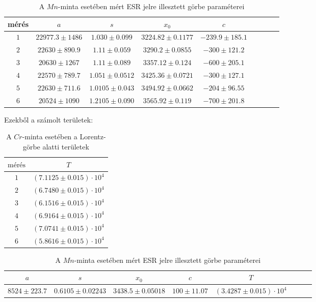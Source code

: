 \documentclass[12pt]{article}
\begin{document}
\begin{center}
\begin{table}[H]
\begin{tabular}{|c|c|c|c|c|c|c|c|c|}
 \hline
mérés & $a$ & $s$ & $x_0$ & $c$ \\ \hline
$1$ & $22977.3 \pm 1486$ & $1.030 \pm  0.099$ & $3224.82 \pm 0.1177$ & $-239.9 \pm 185.1$ \\ \hline
$2$ & $22630 \pm 890.9$ & $1.11 \pm 0.059$ & $3290.2 \pm 0.0855$ & $-300\pm 121.2 $ \\ \hline
$3$ & $20630 \pm 1267$ & $1.11 \pm 0.089$ & $3357.12 \pm  0.124$ & $-600 \pm 205.1$ \\ \hline
$4$ & $22570 \pm 789.7$ & $1.051 \pm 0.0512$ & $3425.36 \pm 0.0721$ & $-300\pm 127.1$ \\ \hline
$5$ & $22630 \pm 711.6$ & $1.0105 \pm 0.043$ & $3494.92 \pm 0.0662$ & $-204\pm 96.55$ \\ \hline
$6$ & $20524 \pm 1090$ & $1.2105 \pm 0.090$ & $3565.92 \pm 0.119$ & $ -700\pm 201.8$ \\ \hline
\end{tabular}
\caption{A $Mn$-minta esetében mért ESR jelre illesztett görbe paraméterei}
\label{tab:1}
\end{table}
\end{center}

Ezekből a számolt területek:
\begin{center}
\begin{table}[H]
\begin{tabular}{|c|c|}
 \hline
$\textrm{mérés}$ & $T$ \\ \hline
$1$ & $(7.1125 \pm 0.015)\cdot10^4$ \\ \hline
$2$ & $(6.7480 \pm 0.015)\cdot10^4$ \\ \hline
$3$ & $(6.1516 \pm 0.015)\cdot10^4$ \\ \hline
$4$ & $(6.9164 \pm 0.015)\cdot10^4$ \\ \hline
$5$ & $(7.0741 \pm 0.015)\cdot10^4$ \\ \hline
$6$ & $(5.8616 \pm 0.015)\cdot10^4$ \\ \hline
\end{tabular}
\caption{A $Cr$-minta esetében a Lorentz-görbe alatti területek}
\label{tab:2}
\end{table}
\end{center}


\begin{center}
\begin{table}[H]
\begin{tabular}{|c|c|c|c|c|c|c|c|}
 \hline
$a$ & $s$ & $x_0$ & $c$  & $T$ \\ \hline
$8524 \pm 223.7$ & $0.6105 \pm 0.02243$ & $3438.5 \pm 0.05018$ & $100 \pm 11.07$ & $(3.4287 \pm 0.015)\cdot10^4$ \\ \hline
\end{tabular}
\caption{A $Mn$-minta esetében mért ESR jelre illesztett görbe paraméterei}
\label{tab:3}
\end{table}
\end{center}
\end{document}
